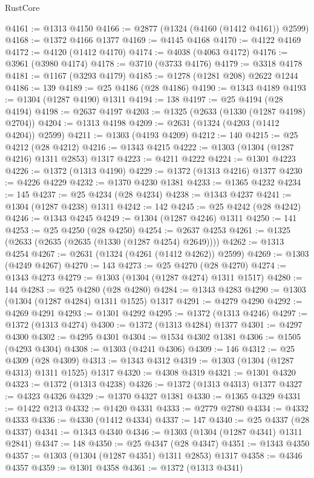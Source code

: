 \begin{lexlean}{RustCore}
\begin{coremodule}
@4161 := @1313 @4150
@4166 := @2877 (@1324 (@4160 (@1412 @4161)) @2599)
@4168 := @1372 @4166 @1377
@4169 := @4145 @4168
@4170 := @4122 @4169
@4172 := @4120 (@1412 @4170)
@4174 := @4038 (@4063 @4172)
@4176 := @3961 (@3980 @4174)
@4178 := @3710 (@3733 @4176)
@4179 := @3318 @4178
@4181 := @1167 (@3293 @4179)
@4185 := @1278 (@1281 @208) @2622 @1244
@4186 := 139
@4189 := @25 @4186 (@28 @4186)
@4190 := @1343 @4189
@4193 := @1304 (@1287 @4190) @1311
@4194 := 138
@4197 := @25 @4194 (@28 @4194)
@4198 := @2637 @4197
@4203 := @1325 (@2633 (@1330 (@1287 @4198) @2704))
@4204 := @1313 @4198
@4209 := @2631 (@1324 (@4203 (@1412 @4204)) @2599)
@4211 := @1303 (@4193 @4209)
@4212 := 140
@4215 := @25 @4212 (@28 @4212)
@4216 := @1343 @4215
@4222 := @1303 (@1304 (@1287 @4216) @1311 @2853) @1317
@4223 := @4211 @4222
@4224 := @1301 @4223
@4226 := @1372 (@1313 @4190)
@4229 := @1372 (@1313 @4216) @1377
@4230 := @4226 @4229
@4232 := @1370 @4230 @1381
@4233 := @1365 @4232
@4234 := 145
@4237 := @25 @4234 (@28 @4234)
@4238 := @1343 @4237
@4241 := @1304 (@1287 @4238) @1311
@4242 := 142
@4245 := @25 @4242 (@28 @4242)
@4246 := @1343 @4245
@4249 := @1304 (@1287 @4246) @1311
@4250 := 141
@4253 := @25 @4250 (@28 @4250)
@4254 := @2637 @4253
@4261 := @1325 (@2633 (@2635 (@2635 (@1330 (@1287 @4254) @2649))))
@4262 := @1313 @4254
@4267 := @2631 (@1324 (@4261 (@1412 @4262)) @2599)
@4269 := @1303 (@4249 @4267)
@4270 := 143
@4273 := @25 @4270 (@28 @4270)
@4274 := @1343 @4273
@4279 := @1303 (@1304 (@1287 @4274) @1311 @1517)
@4280 := 144
@4283 := @25 @4280 (@28 @4280)
@4284 := @1343 @4283
@4290 := @1303 (@1304 (@1287 @4284) @1311 @1525) @1317
@4291 := @4279 @4290
@4292 := @4269 @4291
@4293 := @1301 @4292
@4295 := @1372 (@1313 @4246)
@4297 := @1372 (@1313 @4274)
@4300 := @1372 (@1313 @4284) @1377
@4301 := @4297 @4300
@4302 := @4295 @4301
@4304 := @1534 @4302 @1381
@4306 := @1505 (@4293 @4304)
@4308 := @1303 (@4241 @4306)
@4309 := 146
@4312 := @25 @4309 (@28 @4309)
@4313 := @1343 @4312
@4319 := @1303 (@1304 (@1287 @4313) @1311 @1525) @1317
@4320 := @4308 @4319
@4321 := @1301 @4320
@4323 := @1372 (@1313 @4238)
@4326 := @1372 (@1313 @4313) @1377
@4327 := @4323 @4326
@4329 := @1370 @4327 @1381
@4330 := @1365 @4329
@4331 := @1422 @213
@4332 := @1420 @4331
@4333 := @2779 @2780
@4334 := @4332 @4333
@4336 := @4330 (@1412 @4334)
@4337 := 147
@4340 := @25 @4337 (@28 @4337)
@4341 := @1343 @4340
@4346 := @1303 (@1304 (@1287 @4341) @1311 @2841)
@4347 := 148
@4350 := @25 @4347 (@28 @4347)
@4351 := @1343 @4350
@4357 := @1303 (@1304 (@1287 @4351) @1311 @2853) @1317
@4358 := @4346 @4357
@4359 := @1301 @4358
@4361 := @1372 (@1313 @4341)

\end{coremodule}
\end{lexlean}
